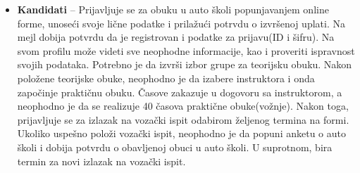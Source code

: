 \begin{itemize}
\item \textbf{Kandidati} – Prijavljuje se za obuku u auto školi  popunjavanjem online forme, unoseći svoje lične podatke i prilažući potrvdu o izvršenoj uplati. Na mejl dobija potvrdu da je registrovan i podatke za prijavu(ID i šifru). Na svom profilu može videti sve neophodne informacije, kao i proveriti ispravnost svojih podataka. Potrebno je da izvrši izbor grupe za teorijsku obuku. Nakon položene teorijske obuke, neophodno je da izabere instruktora i onda započinje praktičnu obuku. Časove zakazuje u dogovoru sa instruktorom, a neophodno je da se realizuje 40 časova praktične obuke(vožnje). Nakon toga, prijavljuje se za izlazak na vozački ispit odabirom željenog termina na formi. Ukoliko uspešno položi vozački ispit, neophodno je da popuni anketu o auto školi i dobija potvrdu o obavljenoj obuci u auto školi. U suprotnom, bira termin za novi izlazak na vozački ispit. 
\end{itemize}
